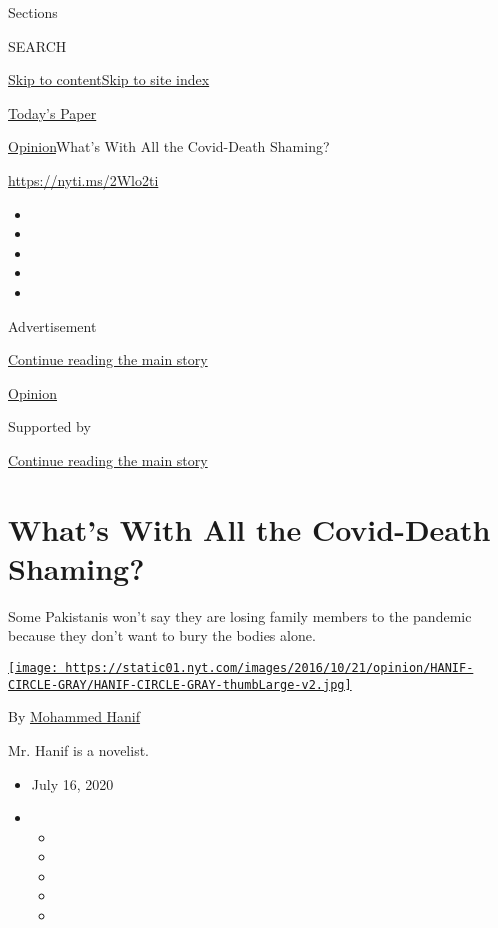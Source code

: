 Sections

SEARCH

\protect\hyperlink{site-content}{Skip to
content}\protect\hyperlink{site-index}{Skip to site index}

\href{https://myaccount.nytimes.com/auth/login?response_type=cookie\&client_id=vi}{}

\href{https://www.nytimes.com/section/todayspaper}{Today's Paper}

\href{/section/opinion}{Opinion}\textbar{}What's With All the
Covid-Death Shaming?

\href{https://nyti.ms/2Wlo2ti}{https://nyti.ms/2Wlo2ti}

\begin{itemize}
\item
\item
\item
\item
\item
\end{itemize}

Advertisement

\protect\hyperlink{after-top}{Continue reading the main story}

\href{/section/opinion}{Opinion}

Supported by

\protect\hyperlink{after-sponsor}{Continue reading the main story}

\hypertarget{whats-with-all-the-covid-death-shaming}{%
\section{What's With All the Covid-Death
Shaming?}\label{whats-with-all-the-covid-death-shaming}}

Some Pakistanis won't say they are losing family members to the pandemic
because they don't want to bury the bodies alone.

\href{https://www.nytimes.com/by/mohammed-hanif}{\texttt{[image: https://static01.nyt.com/images/2016/10/21/opinion/HANIF-CIRCLE-GRAY/HANIF-CIRCLE-GRAY-thumbLarge-v2.jpg]}}

By \href{https://www.nytimes.com/by/mohammed-hanif}{Mohammed Hanif}

Mr. Hanif is a novelist.

\begin{itemize}
\item
  July 16, 2020
\item
  \begin{itemize}
  \item
  \item
  \item
  \item
  \item
  \end{itemize}
\end{itemize}


